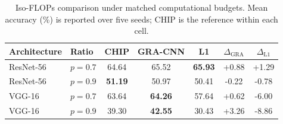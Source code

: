 \begin{table}[t]
\caption{Iso-FLOPs comparison under matched computational budgets. Mean accuracy (\%) is reported over five seeds; CHIP is the reference within each cell.}
\label{tab:equal_budget_ivc}
\scriptsize
\begin{tabular*}{\linewidth}{@{\extracolsep\fill}llccccc}
\toprule
Architecture & Ratio & CHIP & GRA-CNN & L1 & $\Delta_{\mathrm{GRA}}$ & $\Delta_{\mathrm{L1}}$ \\
\midrule
ResNet-56 & $p=0.7$ & 64.64 & 65.52 & \textbf{65.93} & +0.88 & +1.29 \\
ResNet-56 & $p=0.9$ & \textbf{51.19} & 50.97 & 50.41 & -0.22 & -0.78 \\
VGG-16 & $p=0.7$ & 63.64 & \textbf{64.26} & 57.64 & +0.62 & -6.00 \\
VGG-16 & $p=0.9$ & 39.30 & \textbf{42.55} & 30.43 & +3.26 & -8.86 \\
\bottomrule
\end{tabular*}
\end{table}
